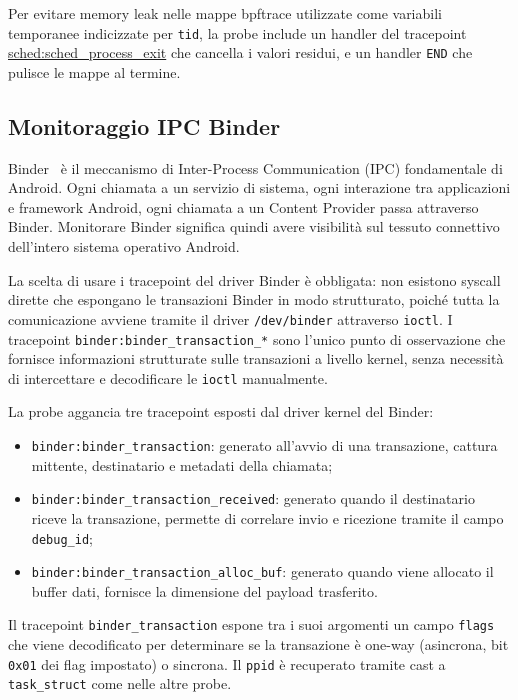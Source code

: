 Per evitare memory leak nelle mappe bpftrace utilizzate come variabili temporanee indicizzate per \texttt{tid}, la probe include un handler del tracepoint \url{sched:sched\_process\_exit} che cancella i valori residui, e un handler \texttt{END} che pulisce le mappe al termine.

\subsection{Monitoraggio IPC Binder}

Binder~\cite{binder_ipc} è il meccanismo di Inter-Process Communication (IPC) fondamentale di Android. Ogni chiamata a un servizio di sistema, ogni interazione tra applicazioni e framework Android, ogni chiamata a un Content Provider passa attraverso Binder. Monitorare Binder significa quindi avere visibilità sul tessuto connettivo dell'intero sistema operativo Android.

La scelta di usare i tracepoint del driver Binder è obbligata: non esistono syscall dirette che espongano le transazioni Binder in modo strutturato, poiché tutta la comunicazione avviene tramite il driver \texttt{/dev/binder} attraverso \texttt{ioctl}. I tracepoint \texttt{binder:binder\_transaction\_*} sono l'unico punto di osservazione che fornisce informazioni strutturate sulle transazioni a livello kernel, senza necessità di intercettare e decodificare le \texttt{ioctl} manualmente.

La probe aggancia tre tracepoint esposti dal driver kernel del Binder:

\begin{itemize}
    \item \texttt{binder:binder\_transaction}: generato all'avvio di una transazione, cattura mittente, destinatario e metadati della chiamata;
    \item \texttt{binder:binder\_transaction\_received}: generato quando il destinatario riceve la transazione, permette di correlare invio e ricezione tramite il campo \texttt{debug\_id};
    \item \texttt{binder:binder\_transaction\_alloc\_buf}: generato quando viene allocato il buffer dati, fornisce la dimensione del payload trasferito.
\end{itemize}

Il tracepoint \texttt{binder\_transaction} espone tra i suoi argomenti un campo \texttt{flags} che viene decodificato per determinare se la transazione è one-way (asincrona, bit \texttt{0x01} dei flag impostato) o sincrona. Il \texttt{ppid} è recuperato tramite cast a \texttt{task\_struct} come nelle altre probe.

